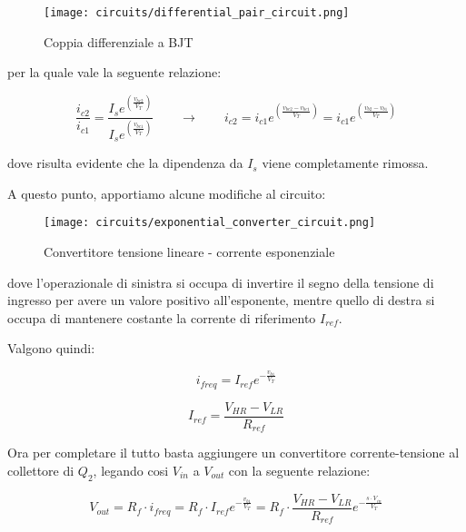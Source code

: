 \begin{figure}[ht]
    \centering
    \texttt{[image: circuits/differential\_pair\_circuit.png]}
    \caption{Coppia differenziale a BJT}
    \label{differential_pair_circuit}
\end{figure}

per la quale vale la seguente relazione:

\begin{displaymath}
    \frac{i_{c2}}{i_{c1}}=\frac{I_s e^{\left(\frac{v_{be2}}{V_T}\right)}}{I_s e^{\left(\frac{v_{be1}}{V_T}\right)}}
    \qquad
    \rightarrow
    \qquad
    i_{c2}=i_{c1}e^{\left(\frac{v_{be2}-v_{be1}}{V_T}\right)}=i_{c1}e^{\left(\frac{v_{b2}-v_{b1}}{V_T}\right)}
\end{displaymath}

dove risulta evidente che la dipendenza da $I_s$ viene completamente rimossa.

A questo punto, apportiamo alcune modifiche al circuito:

\begin{figure}[ht]
    \centering
    \texttt{[image: circuits/exponential\_converter\_circuit.png]}
    \caption{Convertitore tensione lineare - corrente esponenziale}
    \label{exponential_converter_circuit}
\end{figure}

dove l'operazionale di sinistra si occupa di invertire il segno della tensione di ingresso
per avere un valore positivo all'esponente, mentre quello di destra si occupa di mantenere
costante la corrente di riferimento $I_{ref}$.

Valgono quindi:

\begin{displaymath}
    i_{freq}=I_{ref}e^{-\frac{v_{b1}}{V_T}}
\end{displaymath}

\begin{displaymath}
    I_{ref}=\frac{V_{HR}-V_{LR}}{R_{ref}}
\end{displaymath}

Ora per completare il tutto basta aggiungere un convertitore corrente-tensione al collettore
di $Q_2$, legando cosi $V_{in}$ a $V_{out}$ con la seguente relazione:

\begin{displaymath}
    V_{out}=R_f\cdot i_{freq}=
    R_f\cdot I_{ref}e^{-\frac{v_{b1}}{V_T}}=
    R_f\cdot \frac{V_{HR}-V_{LR}}{R_{ref}}e^{-\frac{s\cdot V_{in}}{V_T}}
\end{displaymath}

